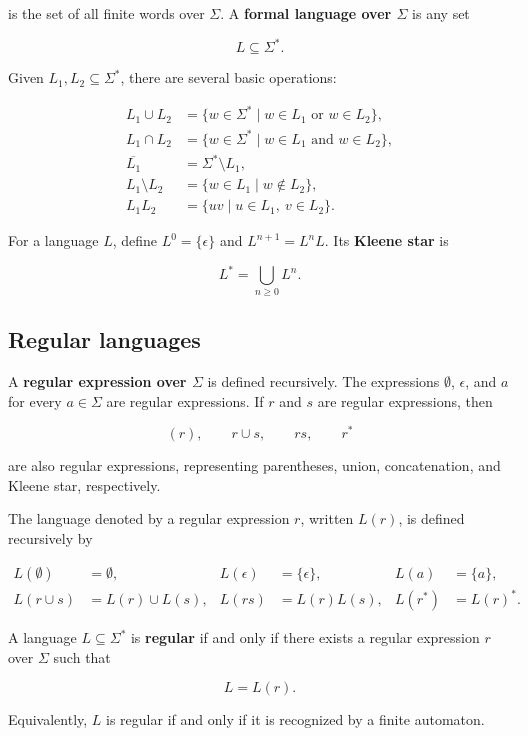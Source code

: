 \documentclass[11pt]{article}
\begin{document}
is the set of all finite words over $\Sigma$. A \textbf{formal language over $\Sigma$} is any set

\[
L\subseteq\Sigma^*.
\]

Given $L_1,L_2\subseteq\Sigma^*$, there are several basic operations:

\[
\begin{aligned}
L_1\cup L_2
  &=\{w\in\Sigma^*\mid w\in L_1\text{ or }w\in L_2\},\\
L_1\cap L_2
  &=\{w\in\Sigma^*\mid w\in L_1\text{ and }w\in L_2\},\\
\overline{L_1}
  &=\Sigma^*\setminus L_1,\\
L_1\setminus L_2
  &=\{w\in L_1\mid w\notin L_2\},\\
L_1L_2
  &=\{uv\mid u\in L_1,\ v\in L_2\}.
\end{aligned}
\]

For a language $L$, define $L^0=\{\epsilon\}$ and $L^{n+1}=L^nL$. Its \textbf{Kleene star} is

\[
L^*=\bigcup_{n\geq 0}L^n.
\]

\subsection{Regular languages}


A \textbf{regular expression over $\Sigma$} is defined recursively. The expressions $\emptyset$, $\epsilon$, and $a$ for every $a\in\Sigma$ are regular expressions. If $r$ and $s$ are regular expressions, then

\[
(r), \qquad r\cup s,\qquad rs,\qquad r^*
\]

are also regular expressions, representing parentheses,  union, concatenation, and Kleene star, respectively.

The language denoted by a regular expression $r$, written $L(r)$, is defined recursively by

\[
\begin{aligned}
L(\emptyset)&=\emptyset, &
L(\epsilon)&=\{\epsilon\}, &
L(a)&=\{a\},\\
L(r \cup s)&=L(r)\cup L(s), &
L(rs)&=L(r)L(s), &
L(r^*)&=L(r)^*.
\end{aligned}
\]

A language $L\subseteq\Sigma^*$ is \textbf{regular} if and only if there exists a regular expression $r$ over $\Sigma$ such that

\[
L=L(r).
\]

Equivalently, $L$ is regular if and only if it is recognized by a finite automaton.
\end{document}
